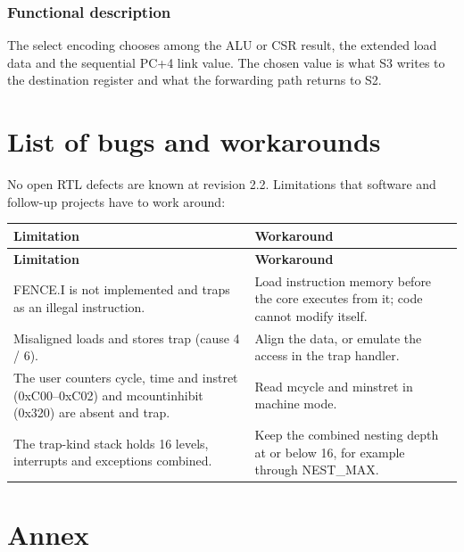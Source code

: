 \documentclass[11pt]{article}
\begin{document}
\subsubsection{Functional description}
\noindent The select encoding chooses among the ALU or CSR result, the extended load data and the sequential PC+4 link value. The chosen value is what S3 writes to the destination register and what the forwarding path returns to S2.\par\medskip

\clearpage
\section{List of bugs and workarounds}
\noindent No open RTL defects are known at revision 2.2. Limitations that software and follow-up projects have to work around:\par\medskip
{\small
\begin{longtable}{@{}L{0.5000\dimexpr\linewidth-12pt\relax}L{0.5000\dimexpr\linewidth-12pt\relax}@{}}
\toprule
\textbf{Limitation} & \textbf{Workaround} \\ \midrule
\endfirsthead
\toprule
\textbf{Limitation} & \textbf{Workaround} \\ \midrule
\endhead
FENCE.I is not implemented and traps as an illegal instruction. & Load instruction memory before the core executes from it; code cannot modify itself. \\ \addlinespace[3pt]
Misaligned loads and stores trap (cause 4 / 6). & Align the data, or emulate the access in the trap handler. \\ \addlinespace[3pt]
The user counters cycle, time and instret (0xC00–0xC02) and mcountinhibit (0x320) are absent and trap. & Read mcycle and minstret in machine mode. \\ \addlinespace[3pt]
The trap-kind stack holds 16 levels, interrupts and exceptions combined. & Keep the combined nesting depth at or below 16, for example through NEST\_MAX. \\*
\bottomrule\end{longtable}}

\clearpage
\section{Annex}
\end{document}
